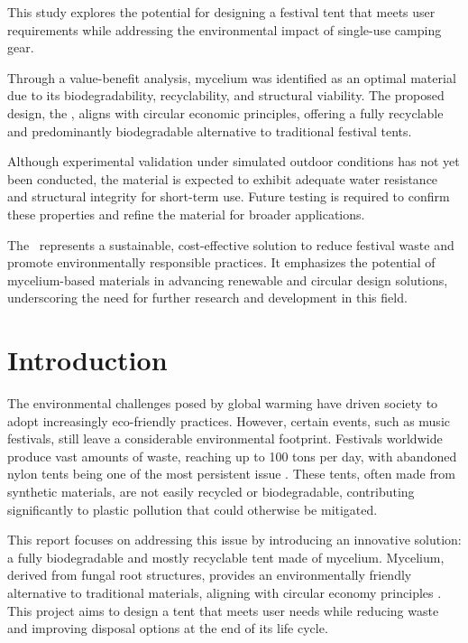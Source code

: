 \documentclass{article}
\begin{document}
This study explores the potential for designing a festival tent that
meets user requirements while addressing the environmental impact of
single-use camping gear.  

Through a value-benefit analysis, mycelium was identified as an
optimal material due to its biodegradability, recyclability, and
structural viability. The proposed design, the \myc,
aligns with circular economic principles, offering a fully recyclable
and predominantly biodegradable alternative to traditional festival
tents. 

Although experimental validation under simulated outdoor conditions
has not yet been conducted, the material is expected to exhibit
adequate water resistance and structural integrity for short-term use.
Future testing is required to confirm these properties and refine the
material for broader applications. 

The \myc\ represents a sustainable, cost-effective solution to
reduce festival waste and promote environmentally responsible
practices. It emphasizes the potential of mycelium-based materials in
advancing renewable and circular design solutions, underscoring the
need for further research and development in this field.

\newpage
\tableofcontents
\thispagestyle{empty}

\newpage
\section{Introduction}
The environmental challenges posed by global warming have driven society to adopt
increasingly eco-friendly practices. However, certain events, such as music festivals,
still leave a considerable environmental footprint. Festivals worldwide produce vast
amounts of waste, reaching up to 100 tons per day, with abandoned nylon tents being one
of the most persistent issue \parencite{Gray2019}. These tents, often made
from synthetic materials, are not easily recycled or biodegradable, contributing
significantly to plastic pollution that could otherwise be mitigated.

This report focuses on addressing this issue by introducing an innovative solution: a
fully biodegradable and mostly recyclable tent made of mycelium. Mycelium, derived from
fungal root structures, provides an environmentally friendly alternative to traditional
materials, aligning with circular economy principles \parencite{attias}. This project
aims to design a tent that meets user needs while reducing waste and improving disposal
options at the end of its life cycle.
\end{document}

